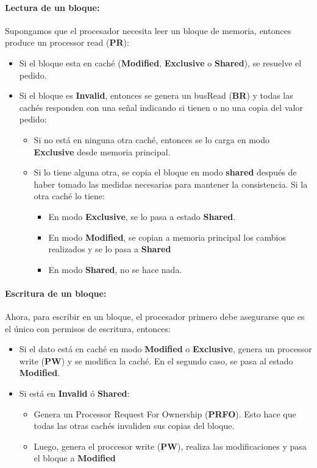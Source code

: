 \paragraph{Lectura de un bloque:}
Supongamos que el procesador necesita leer un bloque de memoria, entonces produce un processor read (\textbf{PR}):
\begin{itemize}
	\item Si el bloque esta en caché (\textbf{Modified}, \textbf{Exclusive} o \textbf{Shared}), se resuelve el pedido.
	\item Si el bloque es \textbf{Invalid}, entonces se genera un busRead (\textbf{BR}) y todas las cachés responden con una señal indicando si tienen o no una copia del valor pedido:
	\begin{itemize}
		\item Si no está en ninguna otra caché, entonces se lo carga en modo \textbf{Exclusive} desde memoria principal.
		\item Si lo tiene alguna otra, se copia el bloque en modo \textbf{shared} después de haber tomado las medidas necesarias para mantener la consistencia. Si la otra caché lo tiene:
		\begin{itemize}
			\item En modo \textbf{Exclusive}, se lo pasa a estado \textbf{Shared}.
			\item En modo \textbf{Modified}, se copian a memoria principal los cambios realizados y se lo pasa a \textbf{Shared}
			\item En modo \textbf{Shared}, no se hace nada.
		\end{itemize}
	\end{itemize}
\end{itemize}

\paragraph{Escritura de un bloque:} Ahora, para escribir en un bloque, el procesador primero debe asegurarse que es el único con permisos de escritura, entonces:

\begin{itemize}
	\item Si el dato está en caché en modo \textbf{Modified} o \textbf{Exclusive}, genera un processor write (\textbf{PW}) y se modifica la caché. En el segundo caso, se pasa al estado \textbf{Modified}.
	\item Si está en \textbf{Invalid} ó \textbf{Shared}:
	\begin{itemize}
		\item Genera un Processor Request For Ownership (\textbf{PRFO}). Esto hace que todas las otras cachés invaliden sus copias del bloque.
		\item Luego, genera el proccesor write (\textbf{PW}), realiza las modificaciones y pasa el bloque a \textbf{Modified}
	\end{itemize}
\end{itemize}
\newpage
